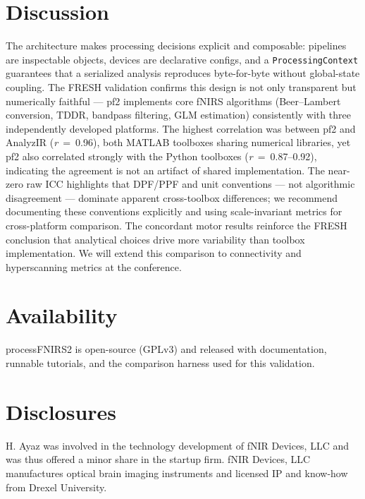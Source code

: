 \documentclass[11pt]{article}
\begin{document}
\section*{Discussion}

The architecture makes processing decisions explicit and composable:
pipelines are inspectable objects, devices are declarative configs, and a
\texttt{ProcessingContext} guarantees that a serialized analysis reproduces
byte-for-byte without global-state coupling. The FRESH validation confirms this
design is not only transparent but numerically faithful --- pf2 implements core
fNIRS algorithms (Beer--Lambert conversion, TDDR, bandpass filtering, GLM
estimation) consistently with three independently developed platforms. The
highest correlation was between pf2 and AnalyzIR (\textit{r}~=~0.96), both
MATLAB toolboxes sharing numerical libraries, yet pf2 also correlated strongly
with the Python toolboxes (\textit{r}~=~0.87--0.92), indicating the agreement is
not an artifact of shared implementation. The near-zero raw ICC highlights that
DPF/PPF and unit conventions --- not algorithmic disagreement --- dominate
apparent cross-toolbox differences; we recommend documenting these conventions
explicitly and using scale-invariant metrics for cross-platform comparison. The
concordant motor results reinforce the FRESH conclusion that analytical choices
drive more variability than toolbox implementation. We will extend this
comparison to connectivity and hyperscanning metrics at the conference.

\section*{Availability}

processFNIRS2 is open-source (GPLv3) and released with documentation, runnable
tutorials, and the comparison harness used for this validation.

\section*{Disclosures}

H. Ayaz was involved in the technology development of fNIR Devices, LLC and was thus offered a minor share in the startup firm. fNIR Devices, LLC manufactures optical brain imaging instruments and licensed IP and know-how from Drexel University.
\end{document}
